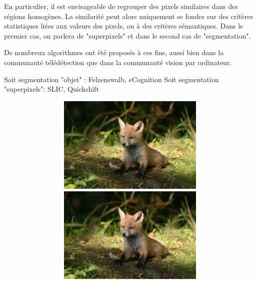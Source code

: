 En particulier, il est envisageable de regrouper des pixels similaires dans des régions homogènes. La similarité peut alors uniquement se fonder sur des critères statistiques liées aux valeurs des pixels, ou à des critères sémantiques. Dans le premier cas, on parlera de "superpixels" et dans le second cas de "segmentation".

De nombreux algorithmes ont été proposés à ces fins, aussi bien dans la communauté télédétection que dans la communauté vision par ordinateur.

Soit segmentation "objet" : Felzenswalb, eCognition
Soit segmentation "superpixels": SLIC, Quickshift

\begin{figure}

\begin{subfigure}{\textwidth}
\begin{subfigure}{0.25\textwidth}
    \includegraphics[width=\textwidth]{Chapitre2/fox}
    \includegraphics[width=\textwidth]{Chapitre2/fox}

\end{subfigure}
\end{subfigure}
\end{figure}
